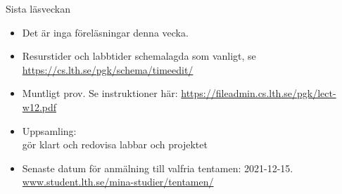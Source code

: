 

\ifkompendium\else


\begin{Slide}{Sista läsveckan}

  \begin{itemize}
    \item Det är inga föreläsningar denna vecka.
    \item Resurstider och labbtider schemalagda som vanligt, se \url{https://cs.lth.se/pgk/schema/timeedit/}
    \item Muntligt prov. Se instruktioner här: \url{https://fileadmin.cs.lth.se/pgk/lect-w12.pdf} 
    \item Uppsamling: \\ gör klart och redovisa  labbar och projektet
    \item Senaste datum för anmälning till valfria tentamen: 2021-12-15. \\\href{https://www.student.lth.se/mina-studier/tentamen/}{www.student.lth.se/mina-studier/tentamen/}
  \end{itemize}

\end{Slide}







